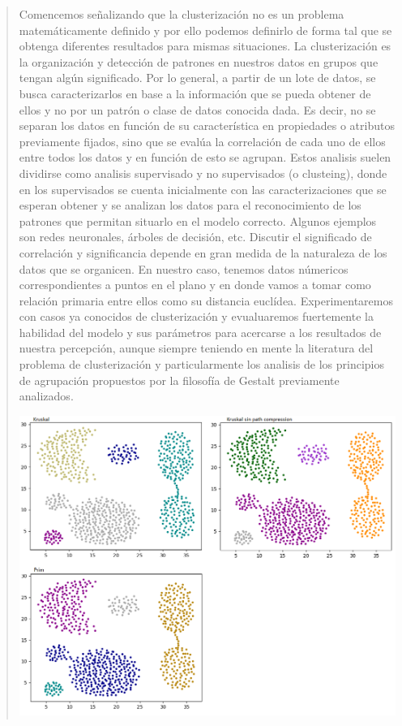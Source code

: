 \documentclass[12pt,a4paper]{article}
\begin{document}
\begin{verse}
Comencemos señalizando que la clusterización no es un problema matemáticamente definido y por ello podemos definirlo de forma tal que se obtenga diferentes resultados para mismas situaciones. 
La clusterización es la organización y detección de patrones en nuestros datos en grupos que tengan algún significado. Por lo general, a partir de un lote de datos, se busca caracterizarlos en base a la información que se pueda obtener de ellos y no por un patrón o clase de datos conocida dada. Es decir, no se separan los datos en función de su característica en propiedades o atributos previamente fijados, sino que se evalúa la correlación de cada uno de ellos entre todos los datos y en función de esto se agrupan. Estos analisis suelen dividirse como analisis supervisado y no supervisados (o clusteing), donde en los supervisados se cuenta inicialmente con las caracterizaciones que se esperan obtener y se analizan los datos para el reconocimiento de los patrones que permitan situarlo en el modelo correcto. Algunos ejemplos son redes neuronales, árboles de decisión, etc. Discutir el significado de correlación y significancia depende en gran medida de la naturaleza de los datos que se organicen. En nuestro caso, tenemos datos númericos correspondientes a puntos en el plano y en donde vamos a tomar como relación primaria entre ellos como su distancia euclídea. Experimentaremos con casos ya conocidos de clusterización y evualuaremos fuertemente la habilidad del modelo y sus parámetros para acercarse a los resultados de nuestra percepción, aunque siempre teniendo en mente la literatura del problema de clusterización y particularmente los analisis de los principios de agrupación propuestos por la filosofía de Gestalt previamente analizados.\\


\begin{center}
\includegraphics[scale=.4]{graficos/aggregation.png}
\end{center}


\end{verse}
\end{document}
